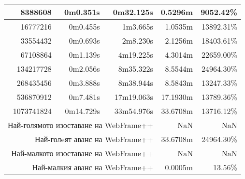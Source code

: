 \documentclass[documentation.tex]{subfiles}
\begin{document}
\begin{longtable}{|r|r|r|r|r|}
        8388608                                             & 0m0.351s                      & 0m32.125s                         & {\color[HTML]{32CB00} 0.5296m}    & {\color[HTML]{32CB00} 9052.42\%}   \\ \hline
        16777216                                            & 0m0.455s                      & 1m3.665s                          & {\color[HTML]{32CB00} 1.0535m}    & {\color[HTML]{32CB00} 13892.31\%}  \\ \hline
        33554432                                            & 0m0.693s                      & 2m8.230s                          & {\color[HTML]{32CB00} 2.1256m}    & {\color[HTML]{32CB00} 18403.61\%}  \\ \hline
        67108864                                            & 0m1.139s                      & 4m19.225s                         & {\color[HTML]{32CB00} 4.3014m}    & {\color[HTML]{32CB00} 22659.00\%}  \\ \hline
        134217728                                           & 0m2.056s                      & 8m35.322s                         & {\color[HTML]{32CB00} 8.5544m}    & {\color[HTML]{32CB00} 24964.30\%}  \\ \hline
        268435456                                           & 0m3.888s                      & 8m38.944s                         & {\color[HTML]{32CB00} 8.5843m}    & {\color[HTML]{32CB00} 13247.33\%}  \\ \hline
        536870912                                           & 0m7.481s                      & 17m19.063s                        & {\color[HTML]{32CB00} 17.1930m}   & {\color[HTML]{32CB00} 13789.36\%}  \\ \hline
        1073741824                                          & 0m14.729s                     & 33m54.976s                        & {\color[HTML]{32CB00} 33.6708m}   & {\color[HTML]{32CB00} 13716.12\%}  \\ \hline
        \multicolumn{3}{|r|}{Най-голямото изоставане на WebFrame++}                                                             & NaN                               & NaN                                \\ \hline
        \multicolumn{3}{|r|}{Най-голeят аванс на WebFrame++}                                                                    & {\color[HTML]{32CB00} 33.6708m}   & {\color[HTML]{32CB00} 24964.30\%}  \\ \hline
        \multicolumn{3}{|r|}{Най-малкото изоставане на WebFrame++}                                                              & NaN                               & NaN                                \\ \hline
        \multicolumn{3}{|r|}{Най-малкия аванс на WebFrame++}                                                                    & {\color[HTML]{32CB00} 0.0005m}    & {\color[HTML]{32CB00} 13.56\%}     \\ \hline
        
        \end{longtable}
\end{document}
